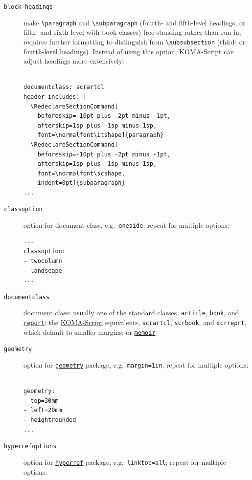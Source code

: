 \documentclass[
  b5paper
]{book}
\begin{document}
\begin{description}
\item[\texttt{block-headings}]
make \texttt{\textbackslash{}paragraph} and
\texttt{\textbackslash{}subparagraph} (fourth- and fifth-level headings,
or fifth- and sixth-level with book classes) free-standing rather than
run-in; requires further formatting to distinguish from
\texttt{\textbackslash{}subsubsection} (third- or fourth-level
headings). Instead of using this option,
\href{https://ctan.org/pkg/koma-script}{KOMA-Script} can adjust headings
more extensively:

\begin{verbatim}
---
documentclass: scrartcl
header-includes: |
  \RedeclareSectionCommand[
    beforeskip=-10pt plus -2pt minus -1pt,
    afterskip=1sp plus -1sp minus 1sp,
    font=\normalfont\itshape]{paragraph}
  \RedeclareSectionCommand[
    beforeskip=-10pt plus -2pt minus -1pt,
    afterskip=1sp plus -1sp minus 1sp,
    font=\normalfont\scshape,
    indent=0pt]{subparagraph}
...
\end{verbatim}
\item[\texttt{classoption}]
option for document class, e.g.~\texttt{oneside}; repeat for multiple
options:

\begin{verbatim}
---
classoption:
- twocolumn
- landscape
...
\end{verbatim}
\item[\texttt{documentclass}]
document class: usually one of the standard classes,
\href{https://ctan.org/pkg/article}{\texttt{article}},
\href{https://ctan.org/pkg/book}{\texttt{book}}, and
\href{https://ctan.org/pkg/report}{\texttt{report}}; the
\href{https://ctan.org/pkg/koma-script}{KOMA-Script} equivalents,
\texttt{scrartcl}, \texttt{scrbook}, and \texttt{scrreprt}, which
default to smaller margins; or
\href{https://ctan.org/pkg/memoir}{\texttt{memoir}}
\item[\texttt{geometry}]
option for \href{https://ctan.org/pkg/geometry}{\texttt{geometry}}
package, e.g.~\texttt{margin=1in}; repeat for multiple options:

\begin{verbatim}
---
geometry:
- top=30mm
- left=20mm
- heightrounded
...
\end{verbatim}
\item[\texttt{hyperrefoptions}]
option for \href{https://ctan.org/pkg/hyperref}{\texttt{hyperref}}
package, e.g.~\texttt{linktoc=all}; repeat for multiple options:


\end{description}
\end{document}
